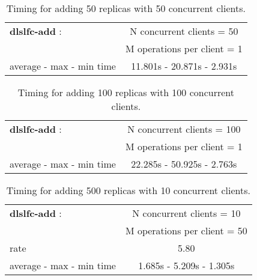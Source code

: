 \documentclass[pdftex]{cmspaper}
\begin{document}
\begin{table}[!htbp]
\begin{center}
 \begin{tabular}{|l|c|}
         \hline
   {\bf dlslfc-add} : & N concurrent clients = 50  \\ & M operations per client = 1\\ \hline
    average - max - min time   & 11.801s - 20.871s - 2.931s\\ \hline
\end{tabular}
\caption {Timing for adding 50 replicas with 50 concurrent clients.}\label{dlslfc-add}
\end{center}
\end{table}

\begin{table}[!htbp]
\begin{center}
 \begin{tabular}{|l|c|}         \hline
   {\bf dlslfc-add} : & N concurrent clients = 100 \\
                      & M operations per client = 1\\ \hline
    average - max - min time  & 22.285s - 50.925s - 2.763s \\ \hline
\end{tabular}
\caption {Timing for adding 100 replicas with 100 concurrent clients.}\label{dlslfc-add}
\end{center}
\end{table}

\begin{table}[!htbp]
\begin{center}
 \begin{tabular}{|l|c|}         \hline
   {\bf dlslfc-add} : & N concurrent clients = 10 \\ 
    & M operations per client = 50\\ \hline
    rate             & 5.80 \\ \hline
    average - max - min time  & 1.685s - 5.209s - 1.305s \\ \hline
\end{tabular}
\caption {Timing for adding 500 replicas with 10 concurrent clients.}\label{dlslfc-add}
\end{center}
\end{table}
\end{document}
